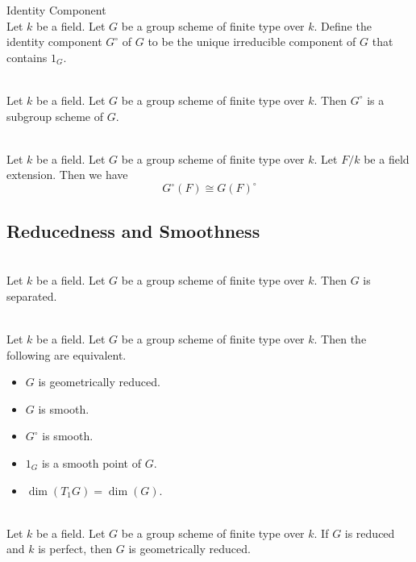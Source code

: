 \documentclass[a4paper]{article}
\begin{document}
\begin{defn}{Identity Component}{}\\
Let $k$ be a field. Let $G$ be a group scheme of finite type over $k$. Define the identity component $G^\circ$ of $G$ to be the unique irreducible component of $G$ that contains $1_G$. 
\end{defn}

\begin{prp}{}{}\\
Let $k$ be a field. Let $G$ be a group scheme of finite type over $k$. Then $G^\circ$ is a subgroup scheme of $G$. 
\end{prp}

\begin{prp}{}{}\\
Let $k$ be a field. Let $G$ be a group scheme of finite type over $k$. Let $F/k$ be a field extension. Then we have $$G^\circ(F)\cong G(F)^\circ$$
\end{prp}

\subsection{Reducedness and Smoothness}
\begin{prp}{}{}\\
Let $k$ be a field. Let $G$ be a group scheme of finite type over $k$. Then $G$ is separated. 
\end{prp}

\begin{prp}{}{}\\
Let $k$ be a field. Let $G$ be a group scheme of finite type over $k$. Then the following are equivalent. 
\begin{itemize}
\item $G$ is geometrically reduced. 
\item $G$ is smooth. 
\item $G^\circ$ is smooth. 
\item $1_G$ is a smooth point of $G$. 
\item $\dim(T_1G)=\dim(G)$. 
\end{itemize}
\end{prp}

\begin{prp}{}{}\\
Let $k$ be a field. Let $G$ be a group scheme of finite type over $k$. If $G$ is reduced and $k$ is perfect, then $G$ is geometrically reduced. 
\end{prp}
\end{document}
